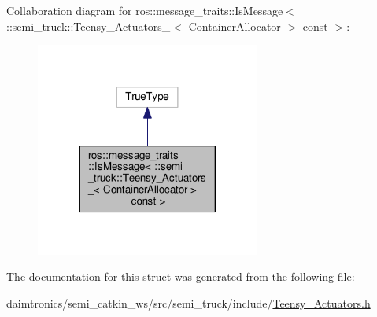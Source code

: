 Collaboration diagram for ros\+:\+:message\+\_\+traits\+:\+:Is\+Message$<$ \+:\+:semi\+\_\+truck\+:\+:Teensy\+\_\+\+Actuators\+\_\+$<$ Container\+Allocator $>$ const $>$\+:\nopagebreak
\begin{figure}[H]
\begin{center}
\leavevmode
\includegraphics[width=209pt]{structros_1_1message__traits_1_1_is_message_3_01_1_1semi__truck_1_1_teensy___actuators___3_01_co6df848739a639501dddc4a4521597a36}
\end{center}
\end{figure}


The documentation for this struct was generated from the following file\+:\begin{DoxyCompactItemize}
\item 
daimtronics/semi\+\_\+catkin\+\_\+ws/src/semi\+\_\+truck/include/\hyperlink{_teensy___actuators_8h}{Teensy\+\_\+\+Actuators.\+h}\end{DoxyCompactItemize}
